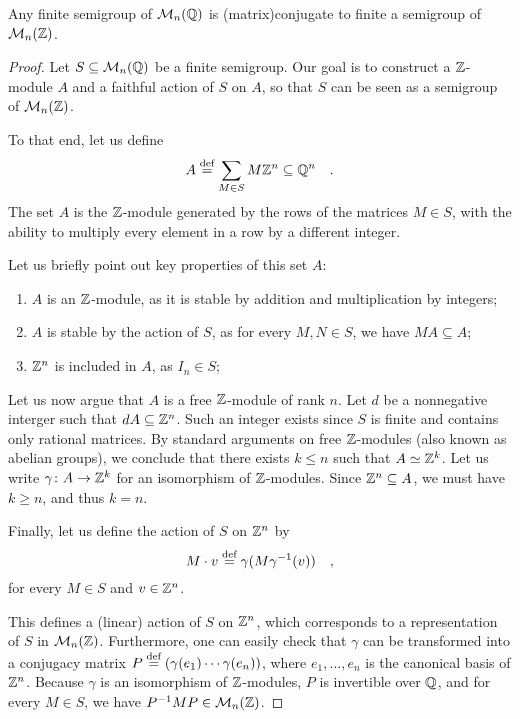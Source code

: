\begin{theorem}\label{thm:finite-semigroup}
    Any finite semigroup of
    $\Mat[n]{\Rat}$ is \kl(matrix){conjugate} to 
    finite a semigroup of $\Mat[n]{\Int}$.
\end{theorem}
\begin{proof}
  Let $S \subseteq \Mat[n]{\Rat}$ be a finite semigroup. Our goal is to 
  construct a $\Int$-module $A$ and a faithful action of $S$ on $A$, so that 
  $S$ can be seen as a semigroup of $\Mat[n]{\Int}$.

  To that end, let us define 
  \begin{equation}
    A \defined \sum_{M \in S} M \Int^n \subseteq \Rat^n
    \quad .
  \end{equation}
  The set $A$ is the $\Int$-module generated by the rows of 
  the matrices $M \in S$, with the ability to multiply every element in 
  a row by a different integer.

  Let us briefly point out key properties of this set $A$:
  \begin{enumerate}
    \item $A$ is an $\Int$-module, as it is stable by addition and 
      multiplication by integers;
    \item $A$ is stable by the action of $S$, as for every $M, N \in S$, 
      we have $M A \subseteq A$;
    \item $\Int^n$ is included in $A$, as $I_n \in S$;
  \end{enumerate}

  Let us now argue that $A$ is a free $\Int$-module of rank $n$. Let $d$ be a
  nonnegative interger such that $dA \subseteq \Int^n$. Such an integer exists
  since $S$ is finite and contains only rational matrices. By standard
  arguments on free $\Int$-modules (also known as abelian groups),
  we conclude that there exists $k \leq n$ such that
  $A \simeq \Int^k$. Let us write $\gamma \colon A \to \Int^k$ for an
  isomorphism of $\Int$-modules. 
  Since $\Int^n \subseteq A$, we must have $k \geq n$, and thus $k = n$.


  Finally, let us define the action of $S$ on $\Int^n$ by
  \begin{equation}
    M \cdot v \defined \gamma(M \gamma^{-1}(v))
    \quad ,
  \end{equation}
  for every $M \in S$ and $v \in \Int^n$.

  This defines a (linear) action of $S$ on $\Int^n$, which corresponds to a
  representation of $S$ in $\Mat[n]{\Int}$. Furthermore,
  one can easily check that $\gamma$ can be transformed into a conjugacy matrix
  $P \defined (\gamma(e_1) \cdots \gamma(e_n))$, where $e_1, \ldots, e_n$ is the
  canonical basis of $\Int^n$. Because $\gamma$ is an isomorphism of
  $\Int$-modules, $P$ is invertible over $\Rat$, and for every $M \in S$,
  we have $P^{-1} M P \in \Mat[n]{\Int}$.
\end{proof}


